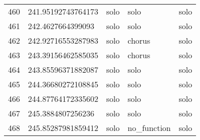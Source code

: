 \begin{table}[]
\begin{tabular}{lllll}
    460  & 241.95192743764173 & solo         & solo            & solo           \\
    461  & 242.4627664399093  & solo         & solo            & solo           \\
    462  & 242.92716553287983 & solo         & chorus          & solo           \\
    463  & 243.39156462585035 & solo         & chorus          & solo           \\
    464  & 243.85596371882087 & solo         & solo            & solo           \\
    465  & 244.36680272108845 & solo         & solo            & solo           \\
    466  & 244.87764172335602 & solo         & solo            & solo           \\
    467  & 245.3884807256236  & solo         & solo            & solo           \\
    468  & 245.85287981859412 & solo         & no\_function    & solo          
    \end{tabular}
    \label{tab:cnn_1200}
\end{table}